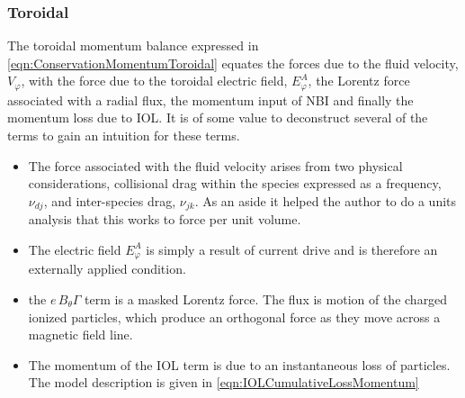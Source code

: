 \subsubsection{Toroidal} \label{subsub:MCToroidal}

The toroidal momentum balance expressed in \cref{eqn:ConservationMomentumToroidal} equates the forces due to the fluid velocity, $V_\varphi$, with the force due to the toroidal electric field, $E_\varphi^A$, the Lorentz force associated with a radial flux, the momentum input of \ac{NBI} and finally the momentum loss due to \ac{IOL}. It is of some value to deconstruct several of the terms to gain an intuition for these terms.
\begin{itemize}
	\item The force associated with the fluid velocity arises from two physical considerations, collisional drag within the species expressed as a frequency, $\nu_{dj}$, and inter-species drag, $\nu_{jk}$. As an aside it helped the author to do a units analysis that this works to force per unit volume.
	\item The electric field $E_\varphi^A$ is simply a result of current drive and is therefore an externally applied condition.
	\item the $e\,B_\theta \Gamma$ term is a masked Lorentz force. The flux is motion of the charged ionized particles, which produce an orthogonal force as they move across a magnetic field line.
	\item The momentum of the \ac{IOL} term is due to an instantaneous loss of particles. The model description is given in \cref{eqn:IOLCumulativeLossMomentum}
\end{itemize}

